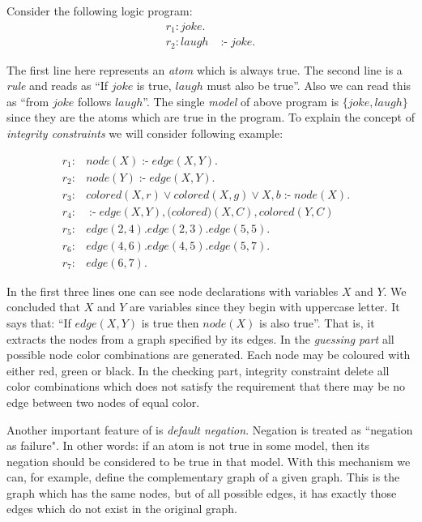 \documentclass[14pt,a4paper, titlepage]{article}
\DeclareMathOperator{\leftimpl}{:-}
\begin{document}
\begin{exmp} 
Consider the following logic program:
\begin{align*}
r_1\colon\mathit{ joke }.& \\
r_2\colon\mathit{ laugh } & \leftimpl \mathit{ joke }.
\end{align*} 
\end{exmp}
The first line here represents an \emph{atom} which is always true. The second line is a \emph{rule} and reads as \enquote{If $\mathit{joke}$ is true, $\mathit{laugh}$ must also be true}. Also we can read this as \enquote{from $\mathit{joke}$ follows $\mathit{laugh}$}. The single \emph{model} of above program is $\{\mathit{joke}, \mathit{laugh}\}$ since they are the atoms which are true in the program. To explain the concept of \emph{integrity constraints} we will consider following example:
\begin{exmp}
\begin{align*}
r_1\colon&\mathit{node}(X) \leftimpl \mathit{edge}(X, Y). &\\
r_2\colon&\mathit{node}(Y) \leftimpl \mathit{edge}(X, Y). & \\
r_3\colon&\mathit{colored}(X, r) \vee \mathit{colored}(X, g) \vee \mathit{X, b} \leftimpl \mathit{node}(X). & \\
r_4\colon&\leftimpl \mathit{edge}(X, Y), \mathit(colored)(X, C), \mathit{colored}(Y, C) & \\
r_5\colon&\mathit{edge}(2, 4). \mathit{edge}(2, 3). \mathit{edge}(5, 5). & \\
r_6\colon&\mathit{edge}(4, 6). \mathit{edge}(4, 5). \mathit{edge}(5, 7). & \\
r_7\colon&\mathit{edge}(6, 7). &
\end{align*} 
\end{exmp}
In the first three lines one can see node declarations with variables $X$ and $Y$. We concluded that $X$ and $Y$ are variables since they begin with uppercase letter. It says that: \enquote{If $\mathit{edge}(X,Y)$ is true then $\mathit{node(X)}$ is also true}. That is, it extracts the nodes from a graph specified by its edges. In the \emph{guessing part} all possible node color combinations are generated. Each node may be coloured with either red, green or black. In the checking part, integrity constraint delete all color combinations which does not satisfy the requirement that there may be no edge between two nodes of equal color. 

Another important feature of \dlvhex{} is \emph{default negation}. Negation is treated as ``negation as failure". In other words: if an atom is not true in some model, then its negation should be considered to be true in that model. With this mechanism we can, for example, define the complementary graph of a given graph. This is the graph which has the same nodes, but of all possible edges, it has exactly those edges which do not exist in the original graph.
\end{document}
